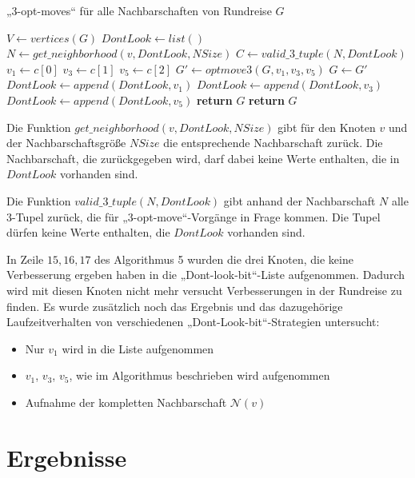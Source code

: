 \begin{algorithm}
  \caption{„3-opt-moves“ für alle Nachbarschaften von Rundreise $G$}\label{alg:ls3opt_run}
\begin{algorithmic}[1]
   
    \State $V \gets vertices(G)$
    \State $DontLook \gets list()$
      \State $N \gets get\_neighborhood(v, DontLook, NSize)$
      \State $C \gets valid\_3\_tuple(N, DontLook)$
        \State $v_1 \gets c[0]$
        \State $v_3 \gets c[1]$
        \State $v_5 \gets c[2]$
        \State $G' \gets optmove3(G, v_1,v_3,v_5)$
          \State $G \gets G'$ 
        \Else
          \State $DontLook \gets append(DontLook, v_1)$ 
          \State $DontLook \gets append(DontLook, v_3)$
          \State $DontLook \gets append(DontLook, v_5)$
        \EndIf
      \EndForeach
        \State \textbf{return} $G$ 
      \EndIf
    \EndForeach
    \State \textbf{return} $G$
  \EndProcedure
\end{algorithmic}
\end{algorithm}

\begin{bem}
  Die Funktion $get\_neighborhood(v, DontLook, NSize)$ gibt für den
  Knoten $v$ und der Nachbarschaftsgröße $NSize$ die entsprechende
  Nachbarschaft zurück. Die Nachbarschaft, die zurückgegeben wird, darf
  dabei keine Werte enthalten, die in $DontLook$ vorhanden sind.
\end{bem}

\begin{bem}
Die Funktion $valid\_3\_tuple(N, DontLook)$ gibt anhand der
  Nachbarschaft $N$ alle 3-Tupel zurück, die für „3-opt-move“-Vorgänge
  in Frage kommen. Die Tupel dürfen keine Werte enthalten, die
  $DontLook$ vorhanden sind.
\end{bem}
In Zeile $15,16,17$ des Algorithmus 5 wurden die drei Knoten, die keine
Verbesserung ergeben haben in die „Dont-look-bit“-Liste aufgenommen.
Dadurch wird mit diesen Knoten nicht mehr versucht Verbesserungen in der
Rundreise zu finden. 
Es wurde zusätzlich noch das Ergebnis und das
dazugehörige Laufzeitverhalten von verschiedenen
„Dont-Look-bit“-Strategien untersucht: 
\begin{itemize}
  \item Nur $v_1$ wird in die Liste aufgenommen
  \item $v_1$, $v_3$, $v_5$, wie im Algorithmus beschrieben wird
    aufgenommen
  \item Aufnahme der kompletten Nachbarschaft $\mathcal{N}(v)$
\end{itemize}
\section{Ergebnisse}
